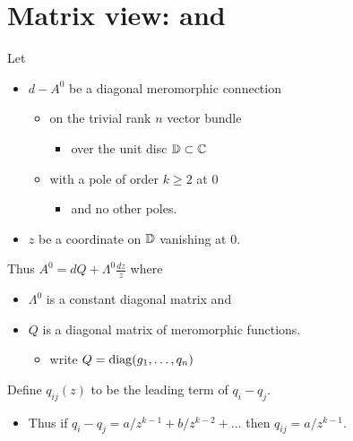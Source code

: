 \section{Matrix view: \cite{boalch} and \cite{thboalch}} %
Let
\begin{itemize}
  \item $d-A^0$ be a diagonal meromorphic connection
    \begin{itemize}
      \item on the trivial rank $n$ vector bundle
        \begin{itemize}
          \item over the unit disc $\mathbb{D}\subset\mathbb{C}$
        \end{itemize}
      \item with a pole of order $k\geq2$ at $0$
        \begin{itemize}
          \item and no other poles.
        \end{itemize}
    \end{itemize}
  \item $z$ be a coordinate on $\mathbb{D}$ vanishing at $0$.
\end{itemize}
Thus $A^0=dQ+\Lambda^0\frac{dz}{z}$ where
\begin{itemize}
  \item $\Lambda^0$ is a constant diagonal matrix and
  \item $Q$ is a diagonal matrix of meromorphic functions.
    \begin{itemize}
      \item write $Q=\operatorname{diag}(g_1,\dots,q_n)$
    \end{itemize}
\end{itemize}
Define $q_{ij}(z)$ to be the leading term of $q_i-q_j$.
\begin{itemize}
  \item Thus if $q_i-q_j=a/z^{k-1}+b/z^{k-2}+\dots$ then $q_{ij}=a/z^{k-1}$.
\end{itemize}
